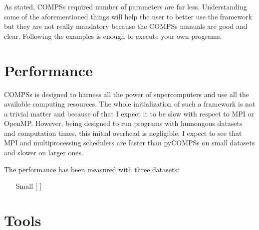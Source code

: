 As stated, COMPSs required number of parameters are far less. Understanding some of the aforementioned things will help the user to better use the framework but they are not really mandatory because the COMPSs manuals are good and clear. Following the examples is enough to execute your own programs. 




\section{Performance}


COMPSs is designed to harness all the power of supercomputers and use all the available computing resources. The whole initialization of such a framework is not a trivial matter and because of that I expect it to be slow with respect to MPI or OpenMP. However, being designed to run programs with humongous datasets and computation times, this initial overhead is negligible. I expect to see that MPI and multiprocessing schedulers are faster than pyCOMPSs on small datasets and slower on larger ones. 

The performance has been measured with three datasets:

\begin{itemize}
\item [Small []]
\end{itemize}


\section{Tools}